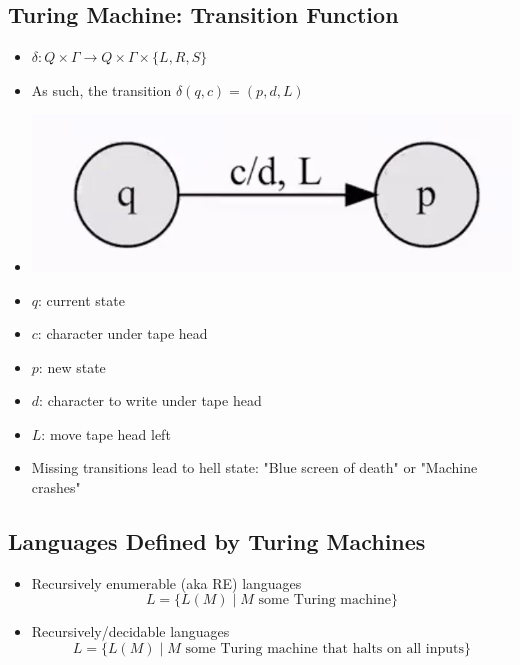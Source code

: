 \subsection{Turing Machine: Transition Function}
\begin{itemize}
    \item $\delta: Q \times \Gamma \rightarrow Q \times \Gamma \times \{ L, R, S \}$
    \item As such, the transition $\delta(q, c) = (p, d, L)$
    \item[] \includegraphics[width=0.6\linewidth]{lecture8/images/turing-transition-function.png}
    \item $q$: current state
    \item $c$: character under tape head
    \item $p$: new state
    \item $d$: character to write under tape head
    \item $L$: move tape head left
    \item Missing transitions lead to hell state: "Blue screen of death" or "Machine crashes"
\end{itemize}

\subsection{Languages Defined by Turing Machines}
\begin{itemize}
    \item Recursively enumerable (aka RE) languages
    \begin{equation}
        L = \{ L(M) \mid M \text{ some Turing machine} \}
    \end{equation}
    \item Recursively/decidable languages
    \begin{equation}
        L = \{ L(M) \mid M \text{ some Turing machine that halts on all inputs} \}
    \end{equation}
\end{itemize}
